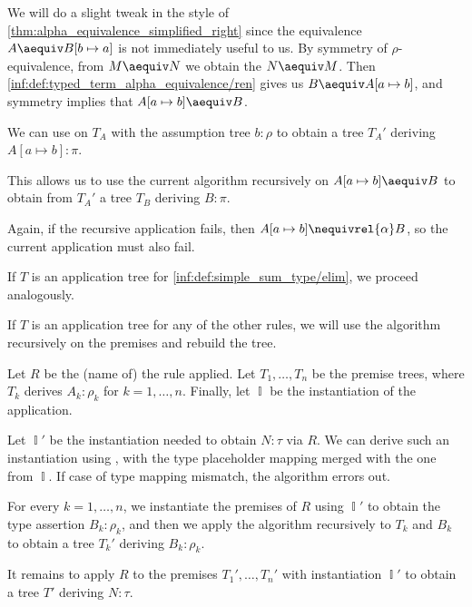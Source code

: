 \begin{algorithm}
\begin{thmenum}
\begin{thmenum}
      We will do a slight tweak in the style of \cref{thm:alpha_equivalence_simplified_right} since the equivalence \( A \aequiv B[b \mapsto a] \) is not immediately useful to us. By symmetry of \( \rho \)-equivalence, from \( M \aequiv N \) we obtain the \( N \aequiv M \). Then \ref{inf:def:typed_term_alpha_equivalence/ren} gives us \( B \aequiv A[a \mapsto b] \), and symmetry implies that \( A[a \mapsto b] \aequiv B \).

      We can use  on \( T_A \) with the assumption tree \( b: \rho \) to obtain a tree \( T_A' \) deriving \( A[a \mapsto b]: \pi \).

      This allows us to use the current algorithm recursively on \( A[a \mapsto b] \aequiv B \) to obtain from \( T_A' \) a tree \( T_B \) deriving \( B: \pi \).

      Again, if the recursive application fails, then \( A[a \mapsto b] \nequivrel{\alpha} B \), so the current application must also fail.
    \end{thmenum}

     If \( T \) is an application tree for \ref{inf:def:simple_sum_type/elim}, we proceed analogously.

     If \( T \) is an application tree for any of the other rules, we will use the algorithm recursively on the premises and rebuild the tree.

    Let \( R \) be the (name of) the rule applied. Let \( T_1, \ldots, T_n \) be the premise trees, where \( T_k \) derives \( A_k: \rho_k \) for \( k = 1, \ldots, n \). Finally, let \( \BbbI \) be the instantiation of the application.

    Let \( \BbbI' \) be the instantiation needed to obtain \( N: \tau \) via \( R \). We can derive such an instantiation using , with the type placeholder mapping merged with the one from \( \BbbI \). If case of type mapping mismatch, the algorithm errors out.

    For every \( k = 1, \ldots, n \), we instantiate the premises of \( R \) using \( \BbbI' \) to obtain the type assertion \( B_k: \rho_k \), and then we apply the algorithm recursively to \( T_k \) and \( B_k \) to obtain a tree \( T_k' \) deriving \( B_k: \rho_k \).

    It remains to apply \( R \) to the premises \( T_1', \ldots, T_n' \) with instantiation \( \BbbI' \) to obtain a tree \( T' \) deriving \( N: \tau \).
  \end{thmenum}
\end{algorithm}
